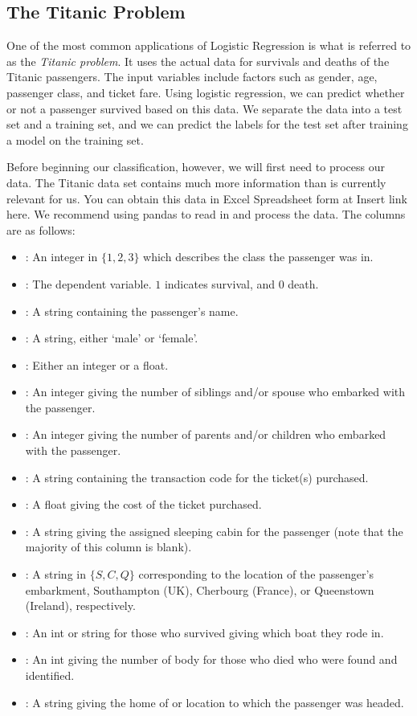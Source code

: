 \subsection*{The Titanic Problem}
One of the most common applications of Logistic Regression is what is referred to as the \emph{Titanic problem}.  It uses the actual data for survivals and deaths of the Titanic passengers.  The input variables include factors such as gender, age, passenger class, and ticket fare.  Using logistic regression, we can predict whether or not a passenger survived based on this data.  We separate the data into a test set and a training set, and we can predict the labels for the test set after training a model on the training set.

Before beginning our classification, however, we will first need to process our data.  The Titanic data set contains much more information than is currently relevant for us.  You can obtain this data in Excel Spreadsheet form at {Insert link here}.  We recommend using pandas to read in and process the data.  The columns are as follows:
\begin{itemize}
\item {}: An integer in $\{1, 2, 3\}$ which describes the class the passenger was in.
\item {}:  The dependent variable.  $1$ indicates survival, and $0$ death.
\item {}: A string containing the passenger's name.
\item {}: A string, either `male' or `female'.
\item {}: Either an integer or a float.
\item {}: An integer giving the number of siblings and/or spouse who embarked with the passenger.
\item {}: An integer giving the number of parents and/or children who embarked with the passenger.
\item {}: A string containing the transaction code for the ticket(s) purchased.
\item {}: A float giving the cost of the ticket purchased.
\item {}: A string giving the assigned sleeping cabin for the passenger (note that the majority of this column is blank).
\item {}: A string in $\{S, C, Q\}$ corresponding to the location of the passenger's embarkment, Southampton (UK), Cherbourg (France), or Queenstown (Ireland), respectively.
\item {}: An int or string for those who survived giving which boat they rode in.
\item {}: An int giving the number of body for those who died who were found and identified.
\item {}: A string giving the home of or location to which the passenger was headed.
\end{itemize}

